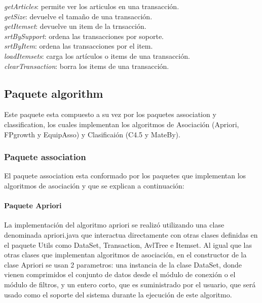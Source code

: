  \textit{getArticles}: permite ver los articulos en una transacci\'on.\\

 \textit{getSize}: devuelve el tama\~no de una transacci\'on.\\

 \textit{getItemset}: devuelve un item de la trnsacci\'on.\\

 \textit{srtBySupport}: ordena las transacciones por soporte.\\

 \textit{srtByItem}: ordena las transacciones por el item.\\

 \textit{loadItemsets}: carga los art\'iculos o items de una transacci\'on.\\

 \textit{clearTransaction}: borra los items de una transacci\'on.\\

\subsection{Paquete algorithm}
Este paquete esta compuesto a su vez por los paquetes association y classification, los cuales implementan los 
algoritmos de Asociaci\'on (Apriori, FPgrowth y EquipAsso) y Clasificai\'on (C4.5 y MateBy).

\subsubsection{Paquete association}
El paquete association esta conformado por los paquetes que implementan los algoritmos de asociaci\'on y que se
explican a continuaci\'on:

\paragraph{Paquete Apriori}
La implementaci\'on del algoritmo apriori se realiz\'o utilizando una clase denominada apriori.java que
interactua directamente con otras clases definidas en el paquete Utils como DataSet, Transaction, AvlTree e
Itemset.  Al igual que las otras clases que implementan algoritmos de asociaci\'on, en el constructor de la clase
Apriori se usan 2 parametros:  una instancia de la clase DataSet, donde vienen comprimidos el conjunto de datos
desde el m\'odulo de conexi\'on o el m\'odulo de filtros, y un entero corto, que es suministrado por el usuario,
que ser\'a usado como el soporte del sistema durante la ejecuci\'on de este algoritmo.\\

